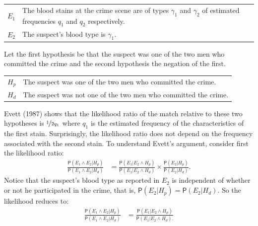 \documentclass[
  10pt,
  dvipsnames,enabledeprecatedfontcommands]{scrartcl}
\newcommand{\pr}[1]{\mathsf{P}(#1)}
\begin{document}
\begin{center}
    \begin{tabular}{lp{10cm}} 
        $E_1$ & The blood stains at the crime scene are of types $\gamma_1$ and $\gamma_2$ of estimated  frequencies $q_1$ and $q_2$ respectively.\\
        $E_2$ & The suspect's blood type is $\gamma_1$. 
    \end{tabular}
 \end{center}
\vspace{2mm}

\noindent  Let the first hypothesis be that the suspect was one of the
two men who committed the crime and the second hypothesis the negation
of the first. \vspace{2mm}

\begin{center}
    \begin{tabular}{lp{12cm}} 
        $H_p$ & The suspect was one of the two men who committed the crime.\\
        $H_d$ & The suspect was not one of the two men who committed the crime.
    \end{tabular}
 \end{center}
\vspace{2mm}

Evett (1987) shows that the likelihood ratio of the match relative to
these two hypotheses is \(\nicefrac{1}{2q_1}\) where \(q_1\) is the
estimated frequency of the characteristics of the first stain.
Surprisingly, the likelihood ratio does not depend on the frequency
associated with the second stain. To understand Evett's argument,
consider first the likelihood ratio: \begin{align*}
\frac{\pr{E_1\wedge E_2\vert H_p}}{
    \pr{E_1\wedge E_2\vert H_d}} & = \frac{\pr{E_1 \vert E_2 \wedge H_p}}{
    \pr{E_1 \vert E_2 \wedge H_d}
    }\times 
 \frac{\pr{E_2\vert H_p}}{\pr{E_2 \vert H_d}}. 
 \end{align*} \noindent Notice that the suspect's blood type as reported
in \(E_2\) is independent of whether or not he participated in the
crime, that is, \(\pr{E_2\vert H_p}=\pr{E_2 \vert H_d}\). So the
likelihood reduces to: \begin{align*}
 \frac{\pr{E_1\wedge E_2\vert H_p}}{
    \pr{E_1\wedge E_2\vert H_d}} & = \frac{\pr{E_1 \vert E_2 \wedge H_p}}{
    \pr{E_1 \vert E_2 \wedge H_d}.
 } 
 \end{align*}
\end{document}

